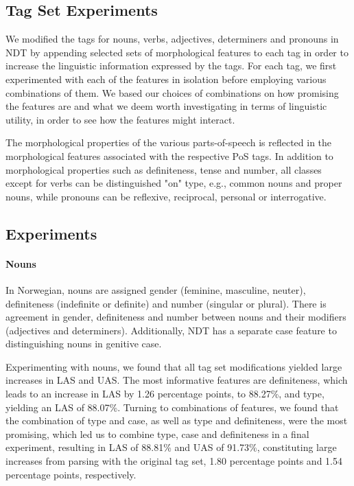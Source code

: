\documentclass[11pt,a4paper]{article}
\begin{document}
\subsection{Tag Set Experiments}
We modified the tags for nouns, verbs, adjectives, determiners and pronouns in
NDT by appending selected sets of morphological features to each tag in order
to increase the linguistic information expressed by the tags.  For each tag, we
first experimented with each of the features in isolation before employing
various combinations of them. We based our choices of combinations on how
promising the features are and what we deem worth investigating in terms of
linguistic utility, in order to see how the features might interact.

The morphological properties of the various parts-of-speech is reflected in the
morphological features associated with the respective PoS tags. In addition to
morphological properties such as definiteness, tense and number, all classes
except for verbs can be distinguished "on" type, e.g., common nouns and proper
nouns, while pronouns can be reflexive, reciprocal, personal or interrogative.

\subsection{Experiments}
\paragraph{Nouns}
In Norwegian, nouns are assigned gender (feminine, masculine, neuter),
definiteness (indefinite or definite) and number (singular or plural). There
is agreement in gender, definiteness and number between nouns and their
modifiers (adjectives and determiners). Additionally, NDT has a separate case
feature to distinguishing nouns in genitive case.

Experimenting with nouns, we found that all tag set modifications yielded large
increases in LAS and UAS. The most informative features are definiteness, which
leads to an increase in LAS by 1.26 percentage points, to 88.27\%, and type,
yielding an LAS of 88.07\%. Turning to combinations of features, we found that
the combination of type and case, as well as type and definiteness, were the
most promising, which led us to combine type, case and definiteness in a final
experiment, resulting in LAS of 88.81\% and UAS of 91.73\%, constituting large
increases from parsing with the original tag set, 1.80 percentage points
and 1.54 percentage points, respectively.
\end{document}
